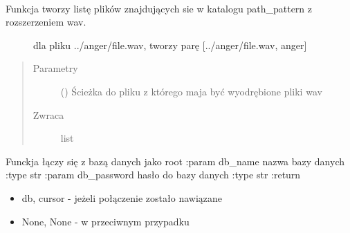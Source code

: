 \documentclass[letterpaper,10pt,polish]{sphinxmanual}
\begin{document}
\begin{fulllineitems}
\label{\detokenize{helper_file:helper_file.build_file_set}}~\begin{description}
\item[{Funkcja tworzy listę plików znajdujących sie w katalogu path\_pattern z rozszerzeniem wav.}] \leavevmode
dla pliku ../anger/file.wav, tworzy parę {[}../anger/file.wav, anger{]}

\end{description}
\begin{quote}\begin{description}
\item[{Parametry}] \leavevmode
{} () \textendash{} Ścieżka do pliku z którego maja być wyodrębione pliki wav

\item[{Zwraca}] \leavevmode
list

\end{description}\end{quote}

\end{fulllineitems}


\begin{fulllineitems}
\label{\detokenize{helper_file:helper_file.connect_to_database}}
Funckja łączy się z bazą danych jako root
:param db\_name nazwa bazy danych
:type str
:param db\_password hasło do bazy danych
:type str
:return
\begin{itemize}
\item {} 
db, cursor - jeżeli połączenie zostało nawiązane

\item {} 
None, None - w przeciwnym przypadku

\end{itemize}

\end{fulllineitems}


\begin{fulllineitems}
\label{\detokenize{helper_file:helper_file.create_summary_table}}
\end{fulllineitems}
\end{document}
